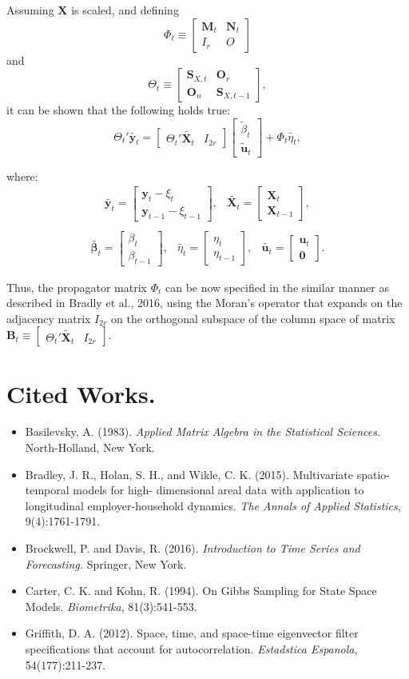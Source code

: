 \documentclass[12pt]{article}
\newcommand{\myvec}[2]{
\left[\begin{array}{c}
#1 \\ #2
\end{array}\right]
}
\newcommand{\mymat}[4]{
\left[\begin{array}{cc}
#1 & #2 \\ #3 & #4
\end{array}\right]
}
\begin{document}
Assuming $\mathbf{X}$ is scaled, and defining
$$
\Phi_t \equiv
\mymat{\mathbf{M}_t}{\mathbf{N}_t}{I_r}{O}
$$
and
$$
\Theta_t \equiv 
\mymat{\mathbf{S}_{X,t}}{\mathbf{O}_r}{\mathbf{O}_n}{\mathbf{S}_{X,t-1}},
$$
it can be shown that the following holds true:
$$
\Theta_t'\tilde{\mathbf{y}_t} = 
\left[
\begin{array}{cc}
\Theta_t'\tilde{\mathbf{X}_t} & I_{2r}
\end{array}
\right]
\myvec{\tilde{\beta}_t}{\tilde{\mathbf{u}}_t}
+ \Phi_t\tilde{\eta_t},
$$

where:
$$
\begin{aligned}
\tilde{\mathbf{y}_t} = \myvec{\mathbf{y}_t-\xi_t}{\mathbf{y}_{t-1}-\xi_{t-1}}, & \tilde{\mathbf{X}_t} = \myvec{\mathbf{X}_t}{\mathbf{X}_{t-1}},\\
\end{aligned}
$$
$$
\begin{aligned}
\tilde{\mathbf{\beta}_t} = \myvec{\beta_t}{\beta_{t-1}}, & \tilde{\eta_t} = \myvec{\eta_t}{\eta_{t-1}}, & \tilde{\mathbf{u}_t} = \myvec{\mathbf{u}_t}{\mathbf{0}}.
\end{aligned}
$$

Thus, the propagator matrix $\Phi_t$ can be now specified in the similar manner as described in Bradly et al., 2016, using the Moran's operator that expands on the adjacency matrix $I_{2r}$ on the orthogonal subspace of the column space of matrix $\mathbf{B}_t \equiv \left[
\begin{array}{cc}
\Theta_t'\tilde{\mathbf{X}_t} & I_{2r}
\end{array}
\right]
$.

\section*{Cited Works.}
\begin{itemize}
\item Basilevsky, A. (1983). {\it Applied Matrix Algebra in the Statistical Sciences.} North-Holland, New York.
\item Bradley, J. R., Holan, S. H., and Wikle, C. K. (2015). Multivariate spatio-temporal models for high- dimensional areal data with application to longitudinal employer-household dynamics. {\it The Annals of Applied Statistics}, 9(4):1761-1791.
\item Brockwell, P. and Davis, R. (2016). {\it Introduction to Time Series and Forecasting.} Springer, New York.
\item Carter, C. K. and Kohn, R. (1994). On Gibbs Sampling for State Space Models. {\it Biometrika}, 81(3):541-553.
\item Griffith, D. A. (2012). Space, time, and space-time eigenvector filter specifications that account for autocorrelation. {\it Estadstica Espanola}, 54(177):211-237.
\end{itemize}
\end{document}
